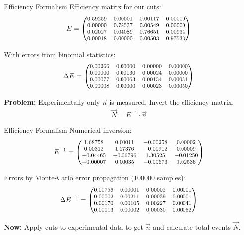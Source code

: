 \documentclass[11pt,xcolor=dvipsnames,professionalfonts]{beamer}
\begin{document}
\begin{frame}{Efficiency Formalism}
	Efficiency matrix for our cuts:
	\begin{align*}
	\footnotesize
	E = \begin{pmatrix}
	0.59259 & 0.00001 & 0.00117 & 0.00000 \\
	0.00000 & 0.78537 & 0.00549 & 0.00000 \\
	0.02027 & 0.04089 & 0.76651 & 0.00934 \\
	0.00018 & 0.00000 & 0.00503 & 0.97533 \\
	\end{pmatrix}
	\end{align*}
	
	With errors from binomial statistics:
	\begin{align*}
	\footnotesize
	\Delta E = \begin{pmatrix}
	0.00266 & 0.00000 & 0.00000 & 0.00000 \\
	0.00000 & 0.00130 & 0.00024 & 0.00000 \\
	0.00077 & 0.00063 & 0.00134 & 0.00031 \\
	0.00008 & 0.00000 & 0.00023 & 0.00050 \\
	\end{pmatrix}
	\end{align*}
		
	\textbf{Problem:} Experimentally only $\vec{n}$ is measured. Invert the efficiency matrix.
	\begin{align*}
		\vec{N} = E^{-1} \cdot \vec{n}
	\end{align*}
\end{frame}

\begin{frame}{Efficiency Formalism}
	Numerical inversion:
	\begin{align*}
	\footnotesize
	E^{-1} = \begin{pmatrix}
	1.68758 & 0.00011 &-0.00258 & 0.00002 \\
	0.00312 & 1.27376 &-0.00912 & 0.00009 \\
	-0.04465 &-0.06796 & 1.30525 &-0.01250 \\
	-0.00007 & 0.00035 &-0.00673 & 1.02536 \\
	\end{pmatrix}
	\end{align*}
	
	Errors by Monte-Carlo error propagation (\num{100000} samples):
	\begin{align*}
	\footnotesize
	\Delta E^{-1} = \begin{pmatrix}
	0.00756 & 0.00001 & 0.00002 & 0.00001 \\
	0.00002 & 0.00211 & 0.00039 & 0.00001 \\
	0.00170 & 0.00105 & 0.00227 & 0.00041 \\
	0.00013 & 0.00002 & 0.00030 & 0.00052 \\
	\end{pmatrix}
	\end{align*}
	
	\textbf{Now:} Apply cuts to experimental data to get $\vec{n}$ and calculate total events $\vec{N}$.
\end{frame}
\end{document}
